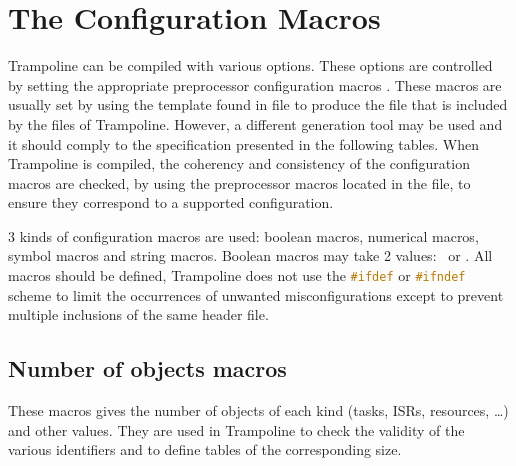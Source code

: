 \section{The Configuration Macros}
\label{sec:configmacros}

Trampoline can be compiled with various options. These options are controlled by setting the appropriate preprocessor configuration macros%
.
These macros are usually set by \goil
using the template found in  file to produce the  file that is included by the files of Trampoline. However, a different generation tool may be used and it should comply to the specification presented in the following tables. When Trampoline is compiled, the coherency and consistency of the configuration macros are checked, by using the preprocessor macros located in the  file, to ensure they correspond to a supported configuration.

3 kinds of configuration macros are used: boolean macros, numerical macros, symbol macros and string macros. Boolean macros may take 2 values: \YES\ or \NO. All macros should be defined, Trampoline does not use the \lstinline[language=C]{#ifdef} or \lstinline[language=C]{#ifndef} scheme to limit the occurrences of unwanted misconfigurations except to prevent multiple inclusions of the same header file.

\subsection{Number of objects macros}

These macros gives the number of objects of each kind (tasks, ISRs, resources, \ldots) and other values. They are used in Trampoline to check the validity of the various identifiers and to define tables of the corresponding size.
 
